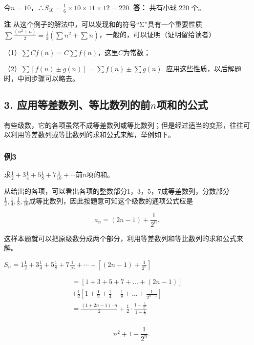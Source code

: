 今\(n = 10\)，∴\(S_{10} = \frac{1}{6} \times 10 \times 11 \times 12 = 220.\)
\textbf{答：} 共有小球 220 个。

\textbf{注} 从这个例子的解法中，可以发现和的符号``Σ''具有一个重要性质
\(\sum \frac{(n^2 + n)}{2} = \frac{1}{2} (\sum n^2 + \sum n)\)，一般的，可以证明（证明留给读者）

（1）\(\sum Cf(n) = C\sum f(n)\)，这里\(C\)为常数；

（2）\(\sum [f(n)\pm g(n)] = \sum f(n)\pm \sum g(n).\)
应用这些性质，以后解题时，中间步骤可以略去。

\subsection{\texorpdfstring{3. 应用等差数列、等比数列的前\(n\)项和的公式}{3. 应用等差数列、等比数列的前n项和的公式}}

有些级数，它的各项虽然不成等差数列或等比数列；但是经过适当的变形，往往可以利用等差数列或等比数列的求和公式来解，举例如下。

\subsubsection{例3}

求\(\frac{1}{2} + 3\frac{1}{4} + 5\frac{1}{8} + 7\frac{1}{16} + \cdots\)前\(n\)项的和。

从给出的各项，可以看出各项的整数部分1，3，5，7成等差数列，分数部分\(\frac{1}{2}, \frac{1}{4}, \frac{1}{8}, \frac{1}{16}\)成等比数列，因此按题意可知这个级数的通项公式应是

\[
a_{n} = (2 n - 1) + \frac{1}{2^{n}}.
\]

这样本题就可以把原级数分成两个部分，利用等差数列和等比数列的求和公式来解。

\(S_{n} = 1\frac{1}{2} + 3\frac{1}{4} + 5\frac{1}{8} + 7\frac{1}{16} + \cdots + [(2n - 1) + \frac{1}{2^{n}}]\)

\[
\begin{array}{l} = [ 1 + 3 + 5 + 7 + \dots + (2 n - 1) ] \\ + \frac{1}{2} \left[ 1 + \frac{1}{2} + \frac{1}{4} + \frac{1}{8} + \dots + \frac{1}{2^{n - 1}} \right] \\ = \frac{(1 + 2 n - 1) \cdot n}{2} + \frac{1}{2} \cdot \frac{1 - \frac{1}{2^{n}}}{1 - \frac{1}{2}} \\ \end{array}
\]

\[
= n^{2} + 1 - \frac{1}{2^{n}}.
\]

